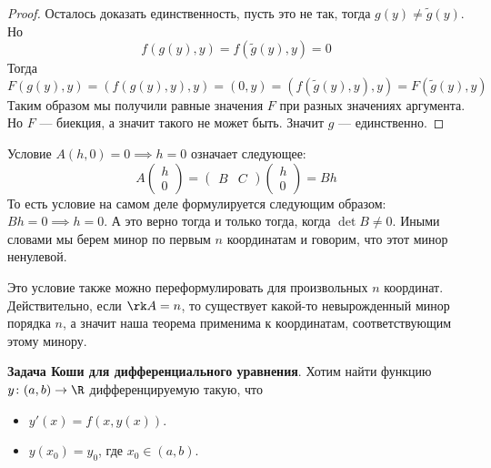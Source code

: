 \begin{proof}
  Осталось доказать единственность, пусть это не так, тогда $g(y) \neq \widetilde{g}(y)$. Но 
  \begin{equation*}
    f(g(y), y) = f(\widetilde{g}(y), y) = 0
  \end{equation*}
  Тогда 
  \begin{equation*}
    F(g(y), y) = (f(g(y), y), y) = (0, y) = (f(\widetilde{g}(y), y), y) = F(\widetilde{g}(y), y)
  \end{equation*}
  Таким образом мы получили равные значения $F$ при разных значениях аргумента. Но $F$ --- биекция, а значит такого не может быть. Значит $g$ --- единственно.
\end{proof}

\notice Условие $A(h, 0) = 0 \implies h = 0$ означает следующее:
\begin{equation*}
  A \begin{pmatrix}
    h \\ 0
  \end{pmatrix}
  =
  \begin{pmatrix}
    B & C
  \end{pmatrix}
  \begin{pmatrix}
    h \\ 0
  \end{pmatrix}
  =
  Bh
\end{equation*}
То есть условие на самом деле формулируется следующим образом: $Bh = 0 \implies h = 0$. А это верно тогда и только тогда, когда $\det B \neq 0$. Иными словами мы берем минор по первым $n$ координатам и говорим, что этот минор ненулевой.

\notice Это условие также можно переформулировать для произвольных $n$ координат. Действительно, если $\rk A = n$, то существует какой-то невырожденный минор порядка $n$, а значит наша теорема применима к координатам, соответствующим этому минору.

\begin{conj}
  \textbf{Задача Коши для дифференциального уравнения}. Хотим найти функцию $y\colon (a, b) \to \R$ дифференцируемую такую, что
  \begin{itemize}
    \item $y'(x) = f(x, y(x))$.
    \item $y(x_0) = y_0$, где $x_0 \in (a, b)$.
  \end{itemize}
\end{conj}

